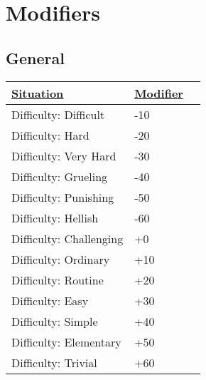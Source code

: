 \section{Modifiers}
\label{situationalmodifiers}
\subsection{General}
\begin{center}
	\begin{tabular}{|l|l|l|}
		\hline
		\ul{Situation}         & \ul{Modifier} \\ \hline
		Difficulty: Difficult   & -10            \\ \hline
		Difficulty: Hard        & -20            \\ \hline
		Difficulty: Very Hard   & -30            \\ \hline
		Difficulty: Grueling    & -40            \\ \hline
		Difficulty: Punishing   & -50            \\ \hline
		Difficulty: Hellish     & -60            \\ \hline
		Difficulty: Challenging & +0             \\ \hline
		Difficulty: Ordinary    & +10            \\ \hline
		Difficulty: Routine     & +20            \\ \hline
		Difficulty: Easy        & +30            \\ \hline
		Difficulty: Simple      & +40            \\ \hline
		Difficulty: Elementary  & +50            \\ \hline
		Difficulty: Trivial     & +60            \\ \hline
	\end{tabular}
\end{center}
